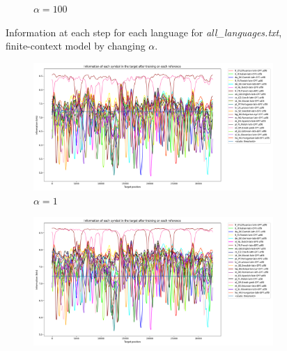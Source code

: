 \documentclass{article}
\begin{document}
\begin{figure}
\begin{subfigure}[b]{0.3\textwidth}
\begin{center}
        \end{center}
        \caption{$\alpha = 100$}
        \label{fig:all_languages_p_c:100:3}
    \end{subfigure}
    
    \caption{Information at each step for each language for \textit{all\_languages.txt}, finite-context model by changing $\alpha$.}
    \label{fig:all_languages_p_c:alpha}
\end{figure}

\begin{figure}
    \begin{subfigure}[b]{0.3\textwidth}
        \begin{center}
            \includegraphics[width=1.0\linewidth]{../results/all_languages_random/-p_c:1:3.png}
        \end{center}
        \caption{$\alpha = 1$}
        \label{fig:all_languages_random_p_c:1:3_again}
    \end{subfigure}
    \hfill
    \begin{subfigure}[b]{0.3\textwidth}
        \begin{center}
            \includegraphics[width=1.0\linewidth]{../results/all_languages_random/-p_c:10:3.png}

\end{center}
\end{subfigure}
\end{figure}
\end{document}
